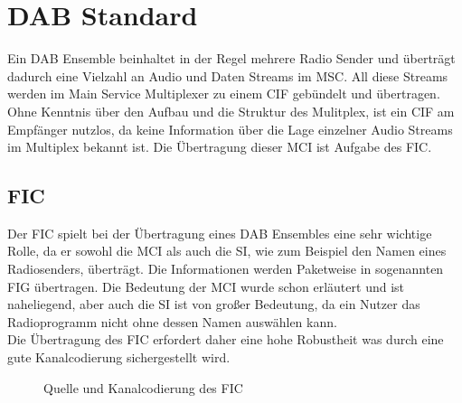 \chapter{DAB Standard}

Ein DAB Ensemble beinhaltet in der Regel mehrere Radio Sender und überträgt dadurch eine Vielzahl an Audio und Daten Streams im \ac{MSC}. All diese Streams werden im Main Service Multiplexer zu einem \ac{CIF} gebündelt und übertragen. Ohne Kenntnis über den Aufbau und die Struktur des Mulitplex, ist ein \ac{CIF} am Empfänger nutzlos, da keine Information über die Lage einzelner Audio Streams im Multiplex bekannt ist. Die Übertragung dieser \ac{MCI} ist Aufgabe des \ac{FIC}.

\section{FIC}
\label{sec:FIC}
Der \ac{FIC} spielt bei der Übertragung eines DAB Ensembles eine sehr wichtige Rolle, da er sowohl die \ac{MCI} als auch die \ac{SI}, wie zum Beispiel den Namen eines Radiosenders, überträgt. Die Informationen werden Paketweise in sogenannten \ac{FIG} übertragen. Die Bedeutung der \ac{MCI} wurde schon erläutert und ist naheliegend, aber auch die \ac{SI} ist von großer Bedeutung, da ein Nutzer das Radioprogramm nicht ohne dessen Namen auswählen kann. \\
Die Übertragung des FIC erfordert daher eine hohe Robustheit was durch eine gute Kanalcodierung sichergestellt wird.
\begin{figure} [h]
\begin{center}
\end{center}
\label{chart:fic_encoder}
\caption{Quelle und Kanalcodierung des FIC}
\end{figure}

